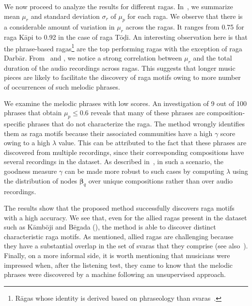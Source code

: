 We now proceed to analyze the results for different \glspl{raga}. In~, we summarize mean $\mu_r$ and standard deviation $\sigma_r$ of $\mu_p$ for each \gls{raga}. We observe that there is a considerable amount of variation in $\mu_r$ across the \glspl{raga}. It ranges from 0.75 for \gls{raga} K\={a}pi to 0.92 in the case of \gls{raga} T\={o}\d{d}i. An interesting observation here is that the phrase-based \glspl{raga}\footnote{R\={a}gas whose identity is derived based on phraseology than svaras~\cite{krishna2012carnatic}.} are the top performing \glspl{raga} with the  exception of \gls{raga} Darb\={a}r. From~ and , we notice a strong correlation between $\mu_r$ and the total duration of the audio recordings across \glspl{raga}. This suggests that longer music pieces are likely to facilitate the discovery of \gls{raga} motifs owing to more number of occurrences of such melodic phrases.

We examine the melodic phrases with low scores. An investigation of 9 out of 100 phrases that obtain $\mu_p\leq0.6$ reveals that many of these phrases are composition-specific phrases that do not characterize the \gls{raga}. The method wrongly identifies them as \gls{raga} motifs because their associated communities have a high $\gamma$ score owing to a high $\lambda$ value. This can be attributed to the fact that these phrases are discovered from multiple recordings, since their corresponding compositions have several recordings in the dataset.  As described in~, in such a scenario, the goodness measure $\gamma$ can be made more robust to such cases by computing $\lambda$ using the distribution of nodes ${\boldsymbol{\beta}_q}$ over unique compositions rather than over audio recordings.

The results show that the proposed method successfully discovers \gls{raga} motifs with a high accuracy. We see that, even for the allied \glspl{raga} present in the dataset such as K\={a}mb\={o}ji and B\={e}gada (), the method is able to discover distinct characteristic \gls{raga} motifs. As mentioned, allied \glspl{raga} are challenging because they have a substantial overlap in the set of svaras that they comprise (see also~). Finally, on a more informal side, it is worth mentioning that musicians were impressed when, after the listening test, they came to know that the melodic phrases were discovered by a machine following an unsupervised approach. 


